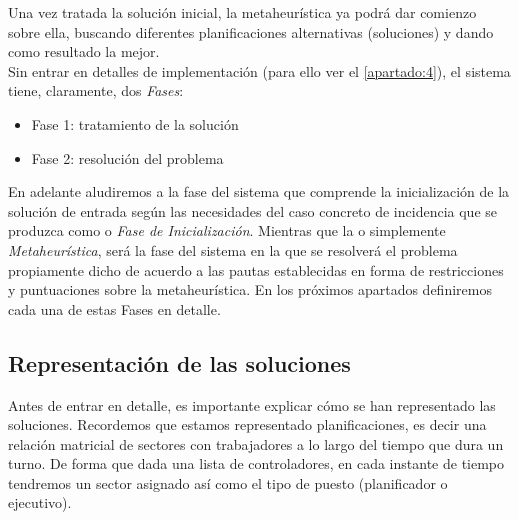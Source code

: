 Una vez tratada la solución inicial, la metaheurística ya podrá dar comienzo sobre ella, buscando diferentes 
planificaciones alternativas (soluciones) y dando como resultado la mejor. 
\\


Sin entrar en detalles de implementación (para ello ver el \autoref{apartado:4}), el sistema tiene, claramente, dos 
\textit{Fases}:
\begin{itemize}
	\item \label{Fase 1} Fase 1: tratamiento de la solución
	\item \label{Fase 2} Fase 2: resolución del problema
\end{itemize}

En adelante aludiremos a la fase del sistema que comprende la inicialización de la solución de entrada según las necesidades del caso concreto de incidencia que se produzca como \faseuno{} o \textit{Fase de Inicialización}. 
Mientras que la \fasedos{} o simplemente \textit{Metaheurística}, será la fase del sistema en la que se resolverá el problema propiamente dicho de acuerdo a las pautas establecidas en forma de restricciones y puntuaciones sobre la metaheurística.
En los próximos apartados definiremos cada una de estas Fases en detalle.

\subsection{Representación de las soluciones}
Antes de entrar en detalle, es importante explicar cómo se han representado las soluciones. Recordemos que estamos representado planificaciones, es decir una relación matricial de sectores con trabajadores a lo largo del tiempo que dura un turno. De forma que dada una lista de controladores, en cada instante de tiempo tendremos un sector asignado así como el tipo de puesto (planificador o ejecutivo).
\\

